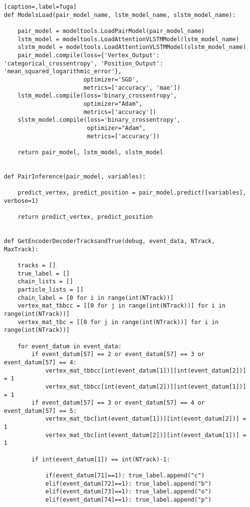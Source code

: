 \begin{lstlisting}[caption=,label=fuga]
def ModelsLoad(pair_model_name, lstm_model_name, slstm_model_name):

    pair_model = modeltools.LoadPairModel(pair_model_name)
    lstm_model = modeltools.LoadAttentionVLSTMModel(lstm_model_name)
    slstm_model = modeltools.LoadAttentionVLSTMModel(slstm_model_name)
    pair_model.compile(loss={'Vertex_Output': 'categorical_crossentropy', 'Position_Output': 'mean_squared_logarithmic_error'},
                       optimizer='SGD',
                       metrics=['accuracy', 'mae'])
    lstm_model.compile(loss='binary_crossentropy',
                       optimizer="Adam",
                       metrics=['accuracy'])
    slstm_model.compile(loss='binary_crossentropy',
                        optimizer="Adam",
                        metrics=['accuracy'])

    return pair_model, lstm_model, slstm_model


def PairInference(pair_model, variables):

    predict_vertex, predict_position = pair_model.predict([variables], verbose=1)

    return predict_vertex, predict_position


def GetEncoderDecoderTracksandTrue(debug, event_data, NTrack, MaxTrack):

    tracks = []
    true_label = []
    chain_lists = []
    particle_lists = []
    chain_label = [0 for i in range(int(NTrack))]
    vertex_mat_tbbcc = [[0 for j in range(int(NTrack))] for i in range(int(NTrack))]
    vertex_mat_tbc = [[0 for j in range(int(NTrack))] for i in range(int(NTrack))]
    
    for event_datum in event_data:
        if event_datum[57] == 2 or event_datum[57] == 3 or event_datum[57] == 4:
            vertex_mat_tbbcc[int(event_datum[1])][int(event_datum[2])] = 1
            vertex_mat_tbbcc[int(event_datum[2])][int(event_datum[1])] = 1
        if event_datum[57] == 3 or event_datum[57] == 4 or event_datum[57] == 5:
            vertex_mat_tbc[int(event_datum[1])][int(event_datum[2])] = 1
            vertex_mat_tbc[int(event_datum[2])][int(event_datum[1])] = 1
        
        if int(event_datum[1]) == int(NTrack)-1:
            
            if(event_datum[71]==1): true_label.append("c")
            elif(event_datum[72]==1): true_label.append("b")
            elif(event_datum[73]==1): true_label.append("o")
            elif(event_datum[74]==1): true_label.append("p")
            

\end{lstlisting}
